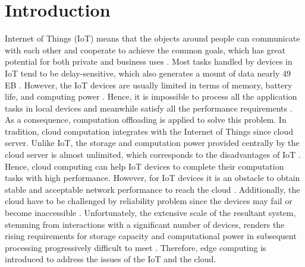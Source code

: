 \documentclass[a4paper,11pt]{article}
\begin{document}
\section{Introduction}

Internet of Things (IoT) means that the objects around people can communicate with each other and cooperate to achieve the common goals, which has great potential for both private and business uses \cite{iot}. Most tasks handled by devices in IoT tend to be delay-sensitive, which also generates a mount of data nearly 49 EB \cite{Distributed_Offloading_in_Overlapping_Areas}. However, the IoT devices are usually limited in terms of memory, battery life, and computing power \cite{Internet_of_Things_offloading_Ongoing_issues, A_Cooperative_Partial_Computation_Offloading_Scheme_for_Mobile_Edge}. Hence, it is impossible to process all the application tasks in local devices and meanwhile satisfy all the performance requirements \cite{Distributed_Offloading_in_Overlapping_Areas}. As a consequence, computation offloading is applied to solve this problem. \newline\newline
In tradition, cloud computation integrates with the Internet of Things since cloud server. Unlike IoT, the storage and computation power provided centrally by the cloud server is almost unlimited, which corresponds to the disadvantages of IoT \cite{cloud_advatange,cloud_central}. Hence, cloud computing can help IoT devices to complete their computation tasks with high performance. However, for IoT devices it is an obstacle to obtain stable and acceptable network performance to reach the cloud \cite{cloud_advatange_and_problem}. Additionally, the cloud have to be challenged by reliability problem since the devices may fail or become inaccessible \cite{cloud_advatange_and_problem}. Unfortunately, the extensive scale of the resultant system, stemming from interactions with a significant number of devices, renders the rising requirements for storage capacity and computational power in subsequent processing progressively difficult to meet \cite{cloud_advatange_and_problem}. Therefore, edge computing is introduced to address the issues of the IoT and the cloud. \newline\newline
\end{document}

